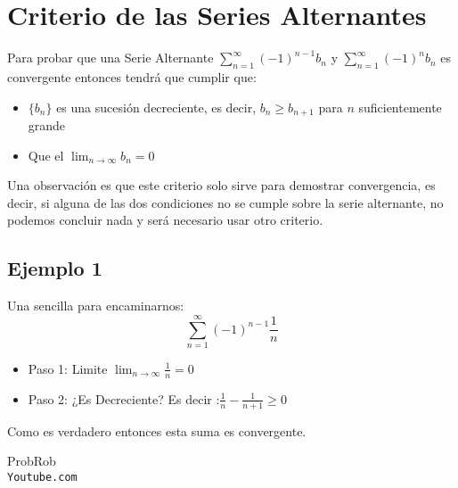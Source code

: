 \documentclass[12pt]{report}							    %
\begin{document}
    \section{Criterio de las Series Alternantes}

        Para probar que una Serie Alternante $\sum_{n=1}^{\infty} (-1)^{n-1} b_n$ y $\sum_{n=1}^{\infty} (-1)^n b_n$ es convergente entonces tendrá que cumplir que:

        \begin{itemize}
            \item $\{b_n\}$ es una sucesión decreciente, es decir, $b_n \geq b_{n+1}$ para $n$ suficientemente grande
            \item Que el $\lim_{n \to \infty} b_n = 0$
        \end{itemize}

        Una observación es que este criterio solo sirve para demostrar convergencia, es decir, si alguna de las dos condiciones no se cumple sobre la serie alternante, no podemos concluir nada y será necesario usar otro criterio.

        \subsection{Ejemplo 1}
        Una sencilla para encaminarnos:
        \begin{equation*}
            \sum_{n=1}^{\infty} (-1)^{n-1} \frac{1}{n}
        \end{equation*}


         \begin{itemize}
            \item Paso 1: Limite $\lim_{n \to \infty} \frac{1}{n}=0$
            \item Paso 2: ¿Es Decreciente? Es decir :$\frac{1}{n}-\frac{1}{n+1} \geq 0 $
         \end{itemize}

        Como es verdadero entonces esta suma es convergente.





\clearpage

	\begin{thebibliography}{9}

		ProbRob
		\\\texttt{Youtube.com}


	 

\end{thebibliography}
\end{document}

